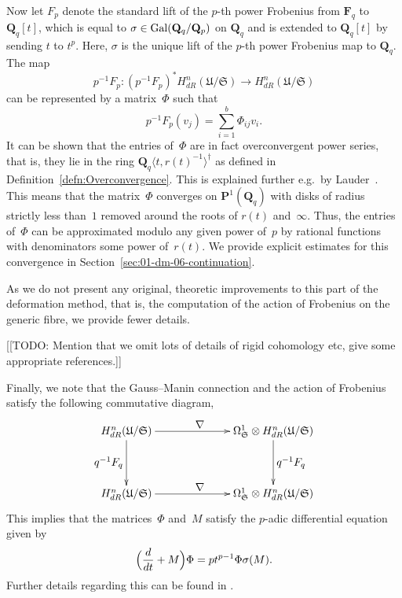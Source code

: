 Now let $F_p$ denote the standard lift of the $p$-th power Frobenius 
from $\mathbf{F}_q$ to $\mathbf{Q}_q[t]$, which is equal to 
$\sigma \in \operatorname{Gal}(\mathbf{Q}_q/\mathbf{Q}_p)$ on $\mathbf{Q}_q$ and 
is extended to $\mathbf{Q}_q[t]$ by sending $t$ to $t^p$.  Here, $\sigma$ 
is the unique lift of the $p$-th power Frobenius map to $\mathbf{Q}_q$.  
The map 
\begin{equation*}
p^{-1} F_p \colon (p^{-1} F_p)^{*} H_{dR}^{n}(\mathfrak{U}/\mathfrak{S}) 
    \to H_{dR}^{n}(\mathfrak{U}/\mathfrak{S})
\end{equation*}
can be represented by a matrix~$\Phi$ such that 
\begin{equation*}
p^{-1} F_p (v_j) = \sum_{i=1}^{b} \Phi_{ij} v_i.
\end{equation*}
It can be shown that the entries of~$\Phi$ are in fact overconvergent 
power series, that is, they lie in the ring 
$\mathbf{Q}_q\langle t, r(t)^{-1}\rangle^{\dagger}$ as defined in 
Definition~\ref{defn:Overconvergence}.  This is explained further 
e.g.\ by Lauder~\citep[\S 3.5]{Lauder2006}.  This means that the 
matrix~$\Phi$ converges on $\mathbf{P}^{1}(\mathbf{Q}_q)$ with disks 
of radius strictly less than~$1$ removed around the roots of $r(t)$ 
and~$\infty$.  Thus, the entries of~$\Phi$ can be approximated modulo 
any given power of~$p$ by rational functions with denominators some 
power of~$r(t)$.  We provide explicit estimates for this convergence 
in Section~\ref{sec:01-dm-06-continuation}.

As we do not present any original, theoretic improvements to this part of 
the deformation method, that is, the computation of the action of Frobenius 
on the generic fibre, we provide fewer details.

[[TODO:  Mention that we omit lots of details of rigid cohomology etc, 
give some appropriate references.]]

Finally, we note that the Gauss--Manin connection and the action of 
Frobenius satisfy the following commutative diagram,
\begin{equation*}
\def\labelstyle{\textstyle}
\xymatrix@C=6.8em@R=4em{
H_{dR}^{n}(\mathfrak{U}/\mathfrak{S}) \ar[d]_{q^{-1} F_q} \ar[r]^{\nabla} & 
\Omega_{\mathfrak{S}}^{1} \otimes H_{dR}^{n}(\mathfrak{U}/\mathfrak{S}) \ar[d]^{q^{-1} F_q} \\
H_{dR}^{n}(\mathfrak{U}/\mathfrak{S}) \ar[r]^{\nabla} & 
\Omega_{\mathfrak{S}}^{1} \otimes H_{dR}^{n}(\mathfrak{U}/\mathfrak{S}) 
}
\end{equation*}
This implies that the matrices~$\Phi$ and~$M$ satisfy the $p$-adic 
differential equation given by 
\begin{equation*}
\Bigl( \frac{d}{dt} + M \Bigr) \Phi = p t^{p-1} \Phi \sigma(M).
\end{equation*}
Further details regarding this can be found in \citep[\S 5]{Gerkmann2007}.

